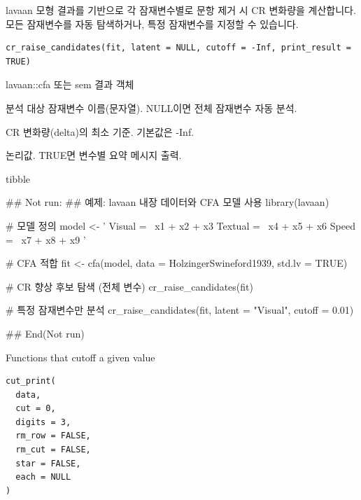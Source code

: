 \documentclass[a4paper]{book}
\begin{document}
%
\begin{Description}
lavaan 모형 결과를 기반으로 각 잠재변수별로 문항 제거 시 CR 변화량을 계산합니다.
모든 잠재변수를 자동 탐색하거나, 특정 잠재변수를 지정할 수 있습니다.
\end{Description}
%
\begin{Usage}
\begin{verbatim}
cr_raise_candidates(fit, latent = NULL, cutoff = -Inf, print_result = TRUE)
\end{verbatim}
\end{Usage}
%
\begin{Arguments}
\begin{ldescription}
\item[\code{fit}] lavaan::cfa 또는 sem 결과 객체

\item[\code{latent}] 분석 대상 잠재변수 이름(문자열). NULL이면 전체 잠재변수 자동 분석.

\item[\code{cutoff}] CR 변화량(delta)의 최소 기준. 기본값은 -Inf.

\item[\code{print\_result}] 논리값. TRUE면 변수별 요약 메시지 출력.
\end{ldescription}
\end{Arguments}
%
\begin{Value}
tibble
\end{Value}
%
\begin{Examples}
\begin{ExampleCode}
## Not run: 
## 예제: lavaan 내장 데이터와 CFA 모델 사용
library(lavaan)

# 모델 정의
model <- '
  Visual  =~ x1 + x2 + x3
  Textual =~ x4 + x5 + x6
  Speed   =~ x7 + x8 + x9
'

# CFA 적합
fit <- cfa(model, data = HolzingerSwineford1939, std.lv = TRUE)

# CR 향상 후보 탐색 (전체 변수)
cr_raise_candidates(fit)

# 특정 잠재변수만 분석
cr_raise_candidates(fit, latent = "Visual", cutoff = 0.01)

## End(Not run)
\end{ExampleCode}
\end{Examples}
%
\begin{Description}
Functions that cutoff a given value
\end{Description}
%
\begin{Usage}
\begin{verbatim}
cut_print(
  data,
  cut = 0,
  digits = 3,
  rm_row = FALSE,
  rm_cut = FALSE,
  star = FALSE,
  each = NULL
)
\end{verbatim}
\end{Usage}
\end{document}
